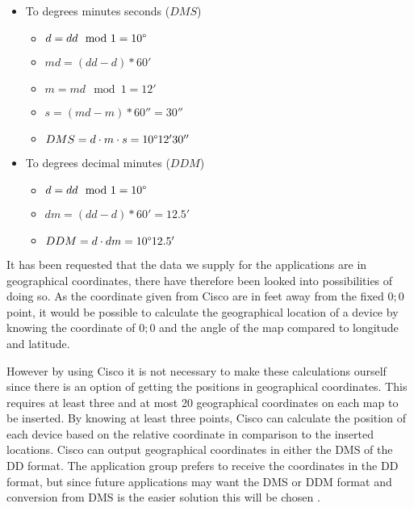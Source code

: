 \begin{itemize}
\begin{itemize}
		\item To degrees minutes seconds ($DMS$)
		\begin{itemize}
			\setlength\itemsep{0.00005em}
			\item $ d = dd \mod 1 = 10\degree $
			\item $ md = (dd - d) * 60' $
			\item $ m = md \mod 1 = 12' $
			\item $ s = (md - m) * 60'' = 30''$
			\item $ DMS = d \cdot m \cdot s = 10\degree 12' 30''$ 
		\end{itemize}
		\item To degrees decimal minutes ($DDM$)
		\begin{itemize}
			\setlength\itemsep{0.00005em}
			\item $ d = dd \mod 1 = 10\degree $
			\item $ dm = (dd - d) * 60' = 12.5' $
			\item $ DDM = d \cdot dm = 10\degree 12.5'$
		\end{itemize}
	\end{itemize}
\end{itemize}

It has been requested that the data we supply for the applications are in geographical coordinates, there have therefore been looked into possibilities of doing so.
As the coordinate given from Cisco are in feet away from the fixed ${0;0}$ point, it would be possible to calculate the geographical location of a device by knowing the coordinate of ${0;0}$ and the angle of the map compared to longitude and latitude. 

However by using Cisco it is not necessary to make these calculations ourself since there is an option of getting the positions in geographical coordinates. This requires at least three and at most 20 geographical coordinates on each map to be inserted. By knowing at least three points, Cisco can calculate the position of each device based on the relative coordinate in comparison to the inserted locations\cite{geo_cisco}. 
Cisco can output geographical coordinates in either the DMS of the DD format\cite{cisco_geo_type}. The application group prefers to receive the coordinates in the DD format, but since future applications may want the DMS or DDM format and conversion from DMS is the easier solution this will be chosen .

